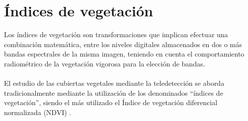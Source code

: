  
\section{\'Indices de vegetaci\'on}
Los \'indices de vegetaci\'on son transformaciones que implican efectuar una combinaci\'on matem\'atica, entre los niveles digitales almacenados en dos o m\'as bandas espectrales de la misma imagen, teniendo en cuenta el comportamiento radiom\'etrico de la vegetaci\'on vigorosa para la elecci\'on de bandas\cite{speranza2005potencialidad}. \\~\\
El estudio de las cubiertas vegetales mediante la teledetecci\'on se aborda tradicionalmente mediante la utilización de los denominados “índices de vegetaci\'on”, siendo el m\'as utilizado el \'Indice de vegetaci\'on diferencial normalizada (NDVI) \cite{sader2000estimacion}.

